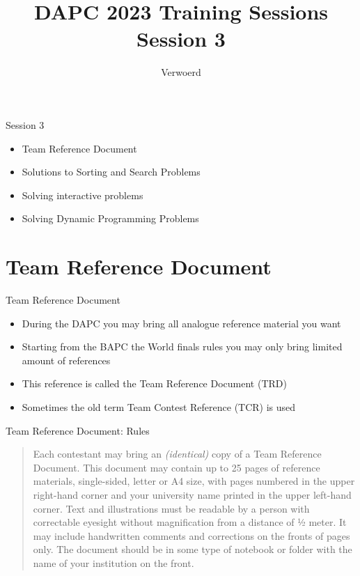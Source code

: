 \documentclass[11pt,pdf, aspectratio=169]{beamer}
\title{DAPC 2023 Training Sessions\\Session 3}
\author{Verwoerd}
\begin{document}
  \maketitle
  \begin{frame}{Session 3}
    \begin{itemize}
      \item Team Reference Document
      \item Solutions to Sorting and Search Problems
      \item Solving interactive problems
      \item Solving Dynamic Programming Problems
    \end{itemize}
    \doclicenseThis
  \end{frame}


  \section{Team Reference Document}
  \begin{frame}{Team Reference Document}
    \begin{itemize}
      \item During the DAPC you may bring all analogue reference material you want
      \item Starting from the BAPC the World finals rules you may only bring limited amount of references
      \item This reference is called the Team Reference Document (TRD)
      \item Sometimes the old term Team Contest Reference (TCR) is used
    \end{itemize}
  \end{frame}
  \begin{frame}{Team Reference Document: Rules}
    \begin{quote}
      Each contestant may bring an \textit{(identical)} copy of a Team Reference Document.
      This document may contain up to 25 pages of reference materials, single-sided, letter or A4 size, with pages numbered in the upper right-hand corner and your university name printed in the upper left-hand corner.
      Text and illustrations must be readable by a person with correctable eyesight without magnification from a distance of ½ meter.
      It may include handwritten comments and corrections on the fronts of pages only.
      The document should be in some type of notebook or folder with the name of your institution on the front.
    \end{quote}
  \end{frame}
\end{document}
